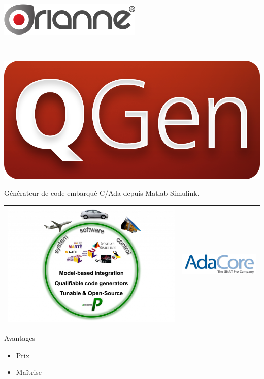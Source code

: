 \documentclass[xcolor=x11names,compress]{beamer}
\begin{document}
\begin{frame}{\vspace{-17pt}\\\includegraphics[scale=0.4]{images/orianne}}
\begin{center}
{\begin{tabular}[h]{m{110pt}m{53pt}m{125pt}}
	  \end{tabular}
	}
  \end{center}
\end{frame}

\begin{frame}{\vspace{-17pt}\\\includegraphics[scale=0.05]{images/qgen}}
  \begin{center}
	Générateur de code embarqué C/Ada depuis Matlab Simulink.\\
	\vfill
	\begin{tabular}[h]{m{150pt}m{150pt}}
	  \includegraphics[scale=0.14]{images/projectp}&
	  \includegraphics[scale=0.24]{images/adacore.png}\\
	\end{tabular}
	\vfill
	\begin{block}{Avantages}{}
	  \begin{itemize}
		\item Prix
		\item Maîtrise
	  \end{itemize}
	\end{block}
  \end{center}
\end{frame}
\end{document}
